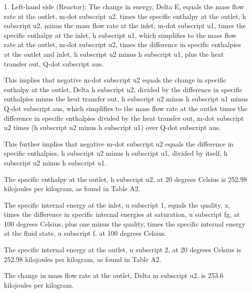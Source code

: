 1. Left-hand side (Reactor): The change in energy, Delta E, equals the mass flow rate at the outlet, m-dot subscript u2, times the specific enthalpy at the outlet, h subscript u2, minus the mass flow rate at the inlet, m-dot subscript u1, times the specific enthalpy at the inlet, h subscript u1, which simplifies to the mass flow rate at the outlet, m-dot subscript u2, times the difference in specific enthalpies at the outlet and inlet, h subscript u2 minus h subscript u1, plus the heat transfer out, Q-dot subscript aus.

This implies that negative m-dot subscript u2 equals the change in specific enthalpy at the outlet, Delta h subscript u2, divided by the difference in specific enthalpies minus the heat transfer out, h subscript u2 minus h subscript u1 minus Q-dot subscript aus, which simplifies to the mass flow rate at the outlet times the difference in specific enthalpies divided by the heat transfer out, m-dot subscript u2 times (h subscript u2 minus h subscript u1) over Q-dot subscript aus.

This further implies that negative m-dot subscript u2 equals the difference in specific enthalpies, h subscript u2 minus h subscript u1, divided by itself, h subscript u2 minus h subscript u1.

The specific enthalpy at the outlet, h subscript u2, at 20 degrees Celsius is 252.98 kilojoules per kilogram, as found in Table A2.

The specific internal energy at the inlet, u subscript 1, equals the quality, x, times the difference in specific internal energies at saturation, u subscript fg, at 100 degrees Celsius, plus one minus the quality, times the specific internal energy at the fluid state, u subscript f, at 100 degrees Celsius.

The specific internal energy at the outlet, u subscript 2, at 20 degrees Celsius is 252.98 kilojoules per kilogram, as found in Table A2.

The change in mass flow rate at the outlet, Delta m subscript u2, is 253.6 kilojoules per kilogram.